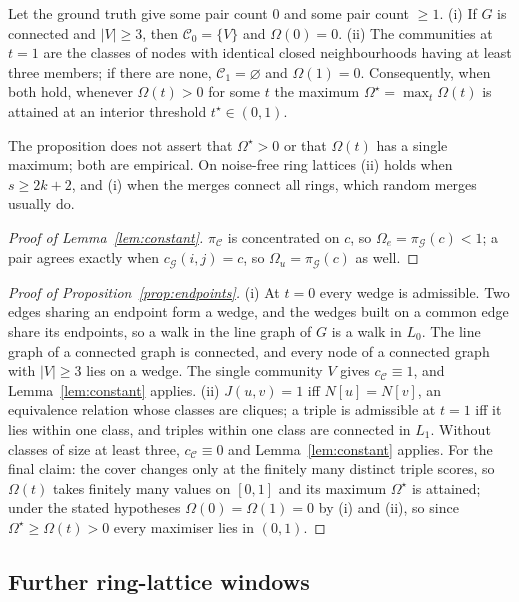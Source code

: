 \begin{proposition}[Endpoints]
\label{prop:endpoints}
Let the ground truth give some pair count $0$ and some pair count $\ge1$.
(i) If $G$ is connected and $|V|\ge3$, then $\mathcal C_0=\{V\}$ and $\Omega(0)=0$.
(ii) The communities at $t=1$ are the classes of nodes with identical closed
neighbourhoods having at least three members; if there are none,
$\mathcal C_1=\varnothing$ and $\Omega(1)=0$.
Consequently, when both hold, whenever $\Omega(t)>0$ for some $t$ the maximum
$\Omega^\star=\max_t\Omega(t)$ is attained at an interior threshold $t^\star\in(0,1)$.
\end{proposition}
The proposition does not assert that $\Omega^\star>0$ or that $\Omega(t)$ has a single
maximum; both are empirical. On noise-free ring lattices (ii) holds when $s\ge2k+2$, and
(i) when the merges connect all rings, which random merges usually do.

\begin{proof}[Proof of Lemma~\ref{lem:constant}]
$\pi_{\mathcal C}$ is concentrated on $c$, so $\Omega_e=\pi_{\mathcal G}(c)<1$; a pair agrees
exactly when $c_{\mathcal G}(i,j)=c$, so $\Omega_u=\pi_{\mathcal G}(c)$ as well.
\end{proof}

\begin{proof}[Proof of Proposition~\ref{prop:endpoints}]
(i) At $t=0$ every wedge is admissible. Two edges sharing an endpoint form a wedge, and
the wedges built on a common edge share its endpoints, so a walk in the line graph of
$G$ is a walk in $L_0$. The line graph of a connected graph is connected, and every
node of a connected graph with $|V|\ge3$ lies on a wedge. The single community $V$
gives $c_{\mathcal C}\equiv1$, and Lemma~\ref{lem:constant} applies.
(ii) $J(u,v)=1$ iff $N[u]=N[v]$, an equivalence relation whose classes are cliques; a
triple is admissible at $t=1$ iff it lies within one class, and triples within one
class are connected in $L_1$. Without classes of size at least three, $c_{\mathcal C}\equiv0$
and Lemma~\ref{lem:constant} applies. For the final claim: the cover changes only at
the finitely many distinct triple scores, so $\Omega(t)$ takes finitely many values on
$[0,1]$ and its maximum $\Omega^\star$ is attained; under the stated hypotheses
$\Omega(0)=\Omega(1)=0$ by (i) and (ii), so since $\Omega^\star\ge\Omega(t)>0$ every
maximiser lies in $(0,1)$.
\end{proof}

\subsection{Further ring-lattice windows}

